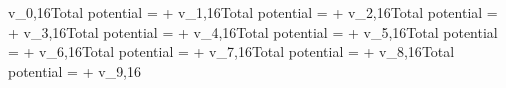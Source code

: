\documentclass[preview]{standalone}
\begin{document}
\begin{center}
v_{0,16}Total potential =  + v_{1,16}Total potential =  + v_{2,16}Total potential =  + v_{3,16}Total potential =  + v_{4,16}Total potential =  + v_{5,16}Total potential =  + v_{6,16}Total potential =  + v_{7,16}Total potential =  + v_{8,16}Total potential =  + v_{9,16}
\end{center}
\end{document}
